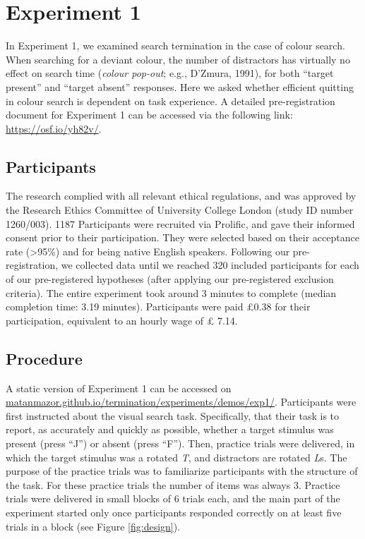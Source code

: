 \documentclass[
  english,
  man]{apa6}
\begin{document}
\hypertarget{experiment-1}{%
\section{Experiment 1}\label{experiment-1}}

In Experiment 1, we examined search termination in the case of colour search. When searching for a deviant colour, the number of distractors has virtually no effect on search time (\emph{colour pop-out}; e.g., D'Zmura, 1991), for both \enquote{target present} and \enquote{target absent} responses. Here we asked whether efficient quitting in colour search is dependent on task experience. A detailed pre-registration document for Experiment 1 can be accessed via the following link: \url{https://osf.io/yh82v/}.

\hypertarget{participants}{%
\subsection{Participants}\label{participants}}

The research complied with all relevant ethical regulations, and was approved by the Research Ethics Committee of University College London (study ID number 1260/003). 1187 Participants were recruited via Prolific, and gave their informed consent prior to their participation. They were selected based on their acceptance rate (\textgreater95\%) and for being native English speakers. Following our pre-registration, we collected data until we reached 320 included participants for each of our pre-registered hypotheses (after applying our pre-registered exclusion criteria). The entire experiment took around 3 minutes to complete (median completion time: 3.19 minutes). Participants were paid £0.38 for their participation, equivalent to an hourly wage of £ 7.14.

\hypertarget{procedure}{%
\subsection{Procedure}\label{procedure}}

A static version of Experiment 1 can be accessed on \url{matanmazor.github.io/termination/experiments/demos/exp1/}. Participants were first instructed about the visual search task. Specifically, that their task is to report, as accurately and quickly as possible, whether a target stimulus was present (press \enquote{J}) or absent (press \enquote{F}). Then, practice trials were delivered, in which the target stimulus was a rotated \emph{T}, and distractors are rotated \emph{L}s. The purpose of the practice trials was to familiarize participants with the structure of the task. For these practice trials the number of items was always 3. Practice trials were delivered in small blocks of 6 trials each, and the main part of the experiment started only once participants responded correctly on at least five trials in a block (see Figure \ref{fig:design}).
\end{document}

